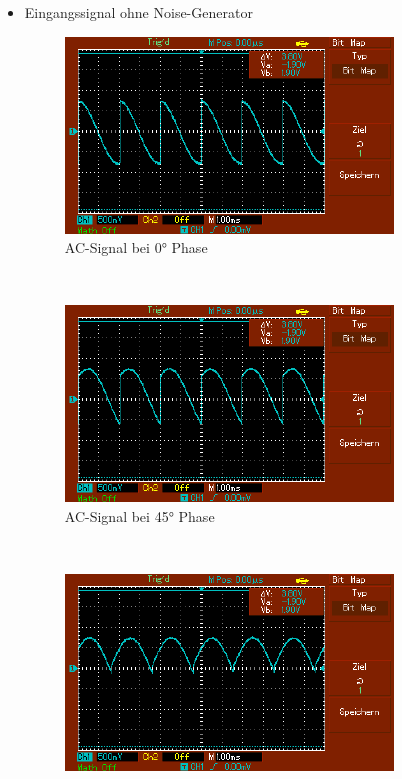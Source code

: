 \documentclass[captions=tableheading]{scrartcl}
\begin{document}
\begin{itemize}
        \newpage
        \item{Eingangssignal ohne Noise-Generator \\}
            \begin{figure}
                \centering
                \includegraphics{Lock_In Bilder/Aufgabe 2/MAP001.pdf}
                \caption{AC-Signal bei 0° Phase}
                \label{fig:0sig}
            \end{figure}
            \\
            \begin{figure}
                \centering
                \includegraphics{Lock_In Bilder/Aufgabe 2/MAP002.pdf}
                \caption{AC-Signal bei 45° Phase}
                \label{fig:45sig}
            \end{figure}
            \\
            \begin{figure}
                \centering
                \includegraphics{Lock_In Bilder/Aufgabe 2/MAP003.pdf}

\end{figure}
\end{itemize}
\end{document}
